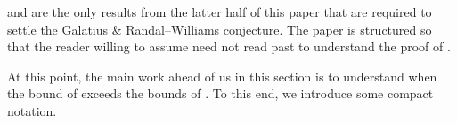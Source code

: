 %
%

\begin{rmk}
 and  are the only results from the latter half of this paper that are required to settle the Galatius \& Randal--Williams conjecture.  The paper is structured so that the reader willing to assume  need not read past  to understand the proof of .
\end{rmk}

%
At this point, the main work ahead of us in this section is to understand when the bound of  exceeds the bounds of . To this end, we introduce some compact notation.


